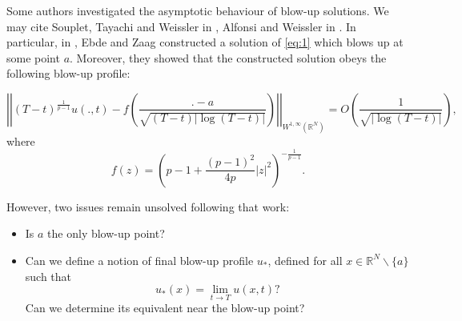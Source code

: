\documentclass[11pt,a4paper]{article}
\newcommand{\1}{\mathbbm{1}}
\numberwithin{equation}{section}
\newcommand{\numberset}{\mathbb}
\newcommand{\R}{\numberset{R}}
\theoremstyle{remark}
\begin{document}
Some authors investigated the asymptotic behaviour of blow-up solutions. We may cite Souplet, Tayachi and Weissler in \cite{STW1996}, Alfonsi and Weissler in \cite{AW1992}. In particular, in \cite{EZ2011}, Ebde and Zaag constructed a solution of \eqref{eq:1} which blows up at some point $a$. Moreover, they showed that the constructed solution obeys the following blow-up profile:

\begin{equation}\label{behaviour1}
\left|\left|(T-t)^{\frac{1}{p-1}}u(.,t)-f\left(\frac{.-a}{\sqrt{(T-t)|\log(T-t)|}}\right)\right|\right|_{W^{1,\infty}(\R^N)}=O\left(\frac{1}{\sqrt{|\log(T-t)|}}\right),
\end{equation}
where
\begin{equation}\label{expression f}
f(z)=\left(p-1+\frac{(p-1)^2}{4p}|z|^2\right)^{-\frac{1}{p-1}}.
\end{equation}


However, two issues remain unsolved following that work:
\begin{itemize}
\item Is $a$ the only blow-up point?
\item Can we define a notion of final blow-up profile $u_*$, defined for all $x\in \R^N\backslash \{a\}$ such that
\begin{equation}\label{u_*}
u_*(x)=\underset{t\rightarrow T}{\lim}u(x,t)?
\end{equation}
Can we determine its equivalent near the blow-up point?
\end{itemize}
\end{document}
